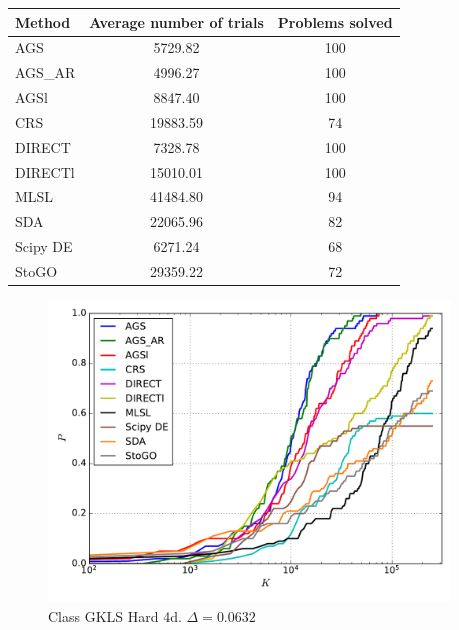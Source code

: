 \documentclass[a4paper]{article}
\begin{document}
\begin{tabular}{lcc}
\hline
 Method   &  Average number of trials  &  Problems solved  \\
\hline
 AGS      &          5729.82           &        100        \\
 AGS\_AR   &          4996.27           &        100        \\
 AGSl     &          8847.40           &        100        \\
 CRS      &          19883.59          &        74         \\
 DIRECT   &          7328.78           &        100        \\
 DIRECTl  &          15010.01          &        100        \\
 MLSL     &          41484.80          &        94         \\
 SDA      &          22065.96          &        82         \\
 Scipy DE &          6271.24           &        68         \\
 StoGO    &          29359.22          &        72         \\
\hline
\end{tabular}
\begin{figure}[H]
  \center
  \includegraphics[width=0.95\textwidth]{../experiments/gklsh4d_serg/cmc.pdf}
  \caption{Class GKLS Hard 4d. $\Delta=0.0632$}

\end{figure}
\end{document}
